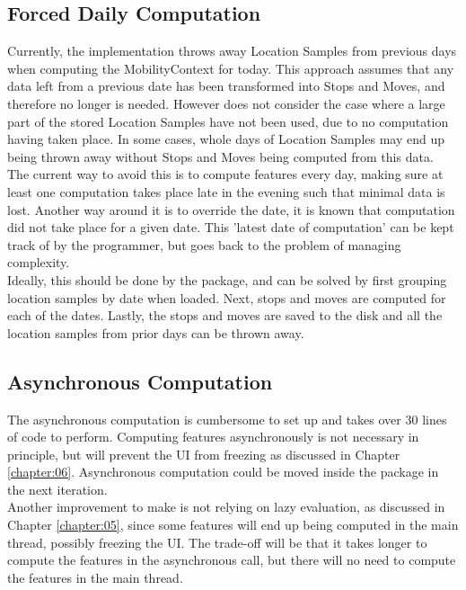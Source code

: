 \subsection{Forced Daily Computation}
Currently, the implementation throws away Location Samples from previous days when computing the MobilityContext for today. This approach assumes that any data left from a previous date has been transformed into Stops and Moves, and therefore no longer is needed. However does not consider the case where a large part of the stored Location Samples have not been used, due to no computation having taken place. In some cases, whole days of Location Samples may end up being thrown away without Stops and Moves being computed from this data.\\

The current way to avoid this is to compute features every day, making sure at least one computation takes place late in the evening such that minimal data is lost. Another way around it is to override the date, it is known that computation did not take place for a given date. This 'latest date of computation' can be kept track of by the programmer, but goes back to the problem of managing complexity. \\

Ideally, this should be done by the package, and can be solved by first grouping location samples by date when loaded. Next, stops and moves are computed for each of the dates. Lastly, the stops and moves are saved to the disk and all the location samples from prior days can be thrown away.

\subsection{Asynchronous Computation}
The asynchronous computation is cumbersome to set up and takes over 30 lines of code to perform. Computing features asynchronously is not necessary in principle, but will prevent the UI from freezing as discussed in Chapter \ref{chapter:06}. Asynchronous computation could be moved inside the package in the next iteration.\\

Another improvement to make is not relying on lazy evaluation, as discussed in Chapter \ref{chapter:05}, since some features will end up being computed in the main thread, possibly freezing the UI. The trade-off will be that it takes longer to compute the features in the asynchronous call, but there will no need to compute the features in the main thread.

